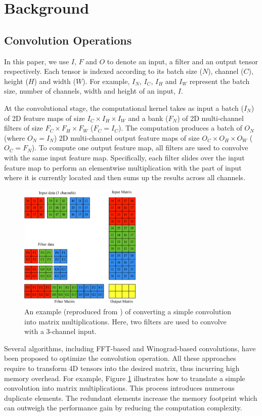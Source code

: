 
\section{Background}

\subsection{Convolution Operations}
In this paper, we use $I$, $F$ and $O$ to denote an input, a filter and an output tensor respectively. Each tensor is indexed according to
its batch size ($N$), channel ($C$), height ($H$) and width ($W$). For example, $I_N$, $I_C$, $I_H$ and $I_W$ represent the batch size,
number of channels, width and height of an input, $I$.

At the convolutional stage, the computational kernel takes as input a batch ($I_N$) of 2D feature maps of size $I_C \times I_H \times I_W$
and a bank ($F_N$) of  2D multi-channel filters of size $F_C \times F_H \times F_W$ ($F_C = I_C$). The computation produces a batch of
$O_N$ (where $O_N=I_N$) 2D multi-channel output feature maps of size $O_C \times O_H \times O_W$ ($O_C=F_N$). To compute one output feature
map, all filters are used to convolve with the same input feature map. Specifically, each filter slides over the input feature map to
perform an elementwise multiplication with the part of input where it is currently located and then sums up the results across all
channels.

\begin{figure}
\centering
  \includegraphics[width=0.75\columnwidth,height=6cm]{./figure/convlowering.eps}
  \caption{An example (reproduced from \cite{ChetlurWVCTCS14}) of converting a simple convolution into matrix multiplications. Here, two filters are used to convolve with a 3-channel input.}
  \label{fig:convlowering}
\end{figure}

Several algorithms, including FFT-based and Winograd-based convolutions, have been proposed to optimize the convolution operation. All
these approaches require to transform 4D tensors into the desired matrix, thus incurring high memory overhead. For example, Figure
\ref{fig:convlowering} illustrates how to translate a simple convolution into matrix multiplications. This process introduces numerous
duplicate elements. The redundant elements increase the memory footprint which can outweigh the performance gain by reducing the
computation complexity.

